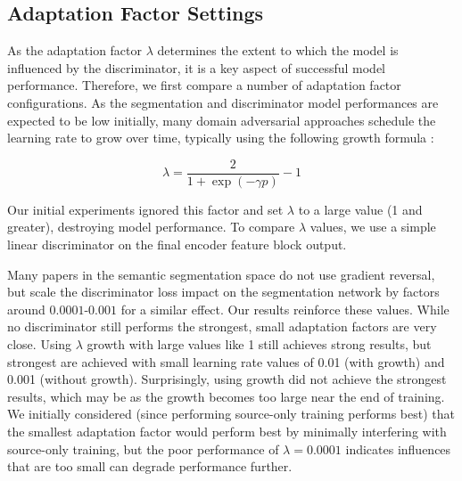 \documentclass[a4paper,12pt]{report}
\begin{document}
\begin{table}[]
    \caption{Baseline experiment results comparing SegFormer and DeeplabV3+. Both experiments used a simplified DCGAN-like [TODO CITE DCGAN] discriminator consisting of 3 convolutional layers with 64, 128, and 2 channels respectively.}
    \label{tab:das-baseline-experiment}
\end{table}

\subsection{Adaptation Factor Settings}
As the adaptation factor $\lambda$ determines the extent to which the model is influenced by the discriminator, it is a key aspect of successful model performance. Therefore, we first compare a number of adaptation factor configurations. As the segmentation and discriminator model performances are expected to be low initially, many domain adversarial approaches schedule the learning rate to grow over time, typically using the following growth formula \cite{ganin_domain-adversarial_2016}:

\begin{equation}
    \lambda = \frac{2}{1 + \exp(-\gamma p)} - 1
\end{equation}

Our initial experiments ignored this factor and set $\lambda$ to a large value (1 and greater), destroying model performance. To compare $\lambda$ values, we use a simple linear discriminator on the final encoder feature block output.

Many papers in the semantic segmentation space do not use gradient reversal, but scale the discriminator loss impact on the segmentation network by factors around $0.0001$-$0.001$ for a similar effect. Our results reinforce these values. While no discriminator still performs the strongest, small adaptation factors are very close. Using $\lambda$ growth with large values like 1 still achieves strong results, but strongest are achieved with small learning rate values of 0.01 (with growth) and 0.001 (without growth). Surprisingly, using growth did not achieve the strongest results, which may be as the growth becomes too large near the end of training. We initially considered (since performing source-only training performs best) that the smallest adaptation factor would perform best by minimally interfering with source-only training, but the poor performance of $\lambda = 0.0001$ indicates influences that are too small can degrade performance further.
\end{document}
